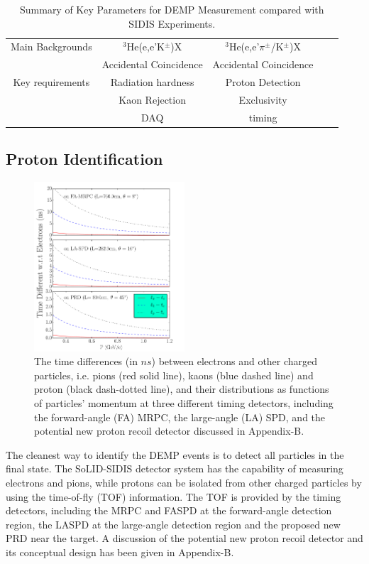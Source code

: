 \begin{table}
\begin{tabular}{|c|c|c|c|c|}
Main Backgrounds           & $\mathrm{^{3}He}$(e,e'K$^\pm$)X            &$\mathrm{^{3}He}$(e,e'$\pi^{\pm}$/K$^\pm$)X  \\
                           &   Accidental Coincidence & Accidental Coincidence	\\\hline
Key requirements           &  Radiation hardness      & Proton Detection	\\
                           &  Kaon Rejection          & Exclusivity	\\
                           &  DAQ                     &    timing   \\
                        \hline
\end{tabular}
\caption{\footnotesize{Summary of Key Parameters for DEMP Measurement compared
    with SIDIS Experiments.}}\label{table:program_summary}
\label{table:key_par_sidis_dvcs}
\end{table} 

\newpage
\subsection{Proton Identification}
\begin{figure}[!ht]
 \begin{center}
  \includegraphics[width=0.5\textwidth]{./figures/time_diff.pdf}
   \caption[Time-of-time]{\footnotesize{The time differences (in $ns$) between electrons and other charged particles, i.e. pions (red solid line), kaons (blue dashed line) and proton (black dash-dotted line), and their distributions as functions of particles' momentum at three different timing detectors, including the forward-angle (FA) MRPC, the large-angle (LA) SPD, and the potential new proton recoil detector discussed in Appendix-B.}}
   \label{tof_diff}
 \end{center}
\end{figure}
The cleanest way to identify the DEMP events is to detect all particles in the final state. The SoLID-SIDIS detector system has the capability of measuring electrons and pions, while protons can be isolated from other charged particles by using the time-of-fly (TOF) information. The TOF is provided by the timing detectors, including the MRPC and FASPD at the forward-angle detection region, the LASPD at the large-angle detection region and the proposed new PRD near the target. A discussion of the potential new proton recoil detector and its conceptual design has been given in Appendix-B.

